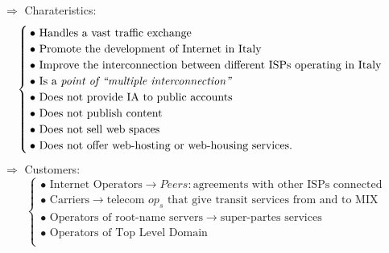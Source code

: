 $\Rightarrow$ Charateristics:
\begin{equation}
\begin{cases}
\bullet \text{ Handles a vast traffic exchange}\\
\bullet \text{ Promote the development of Internet in Italy}\\
\bullet \text{ Improve the interconnection between different ISPs operating in Italy}\\
\bullet \text{ Is a \textit{point of “multiple
interconnection”}}\\
\bullet \text{ Does not provide IA to public accounts}\\
\bullet \text{ Does not publish content}\\
\bullet \text{ Does not sell web spaces}\\
\bullet \text{ Does not offer web-hosting or web-housing services.}
\end{cases}
\end{equation}
$\Rightarrow$ Customers:
\begin{equation}
\begin{cases}
\bullet \text{ Internet Operators} \rightarrow Peers:\text{agreements with other ISPs connected}\\
\bullet \text{ Carriers} \rightarrow \text{telecom } op_s \text{ that give transit services from and to MIX}\\
\bullet \text{ Operators of root-name servers} \rightarrow \text{super-partes services}\\
\bullet \text{ Operators of Top Level Domain}\\
\end{cases}
\end{equation}


